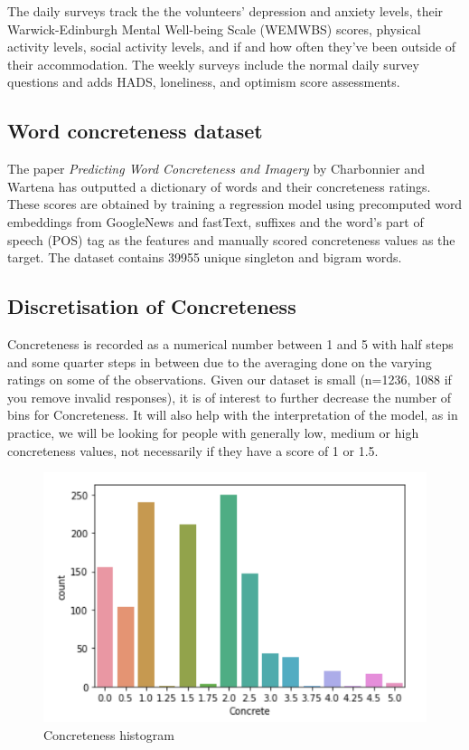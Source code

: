 \documentclass[12pt, a4paper]{article}
\begin{document}
The daily surveys track the the volunteers' depression and anxiety levels, their Warwick-Edinburgh Mental Well-being Scale (WEMWBS) scores, physical activity levels,  social activity levels, and if and how often they've been outside of their accommodation. The weekly surveys include the normal daily survey questions and adds HADS, loneliness, and optimism score assessments.

\subsection{Word concreteness dataset}
The paper \textit{Predicting Word Concreteness and Imagery} \cite{charbonnier-wartena-2019-predicting} by Charbonnier and Wartena has outputted a dictionary of words and their concreteness ratings. These scores are obtained by training a regression model using precomputed word embeddings from GoogleNews and fastText, suffixes and the word's part of speech (POS) tag as the features and manually scored concreteness values as the target. The dataset contains 39955 unique singleton and bigram words.

\subsection{Discretisation of Concreteness}
Concreteness is recorded as a numerical number between 1 and 5 with half steps and some quarter steps in between due to the averaging done on the varying ratings on some of the observations. Given our dataset is small (n=1236, 1088 if you remove invalid responses), it is of interest to further decrease the number of bins for Concreteness. It will also help with the interpretation of the model, as in practice, we will be looking for people with generally low, medium or high concreteness values, not necessarily if they have a score of 1 or 1.5. 

\begin{figure}[ht]
\centerline{\includegraphics[scale=0.8]{concreteness_distribution.png}}
\caption{Concreteness histogram}
\label{concreteness_distribution}
\end{figure}
 
\end{document}
